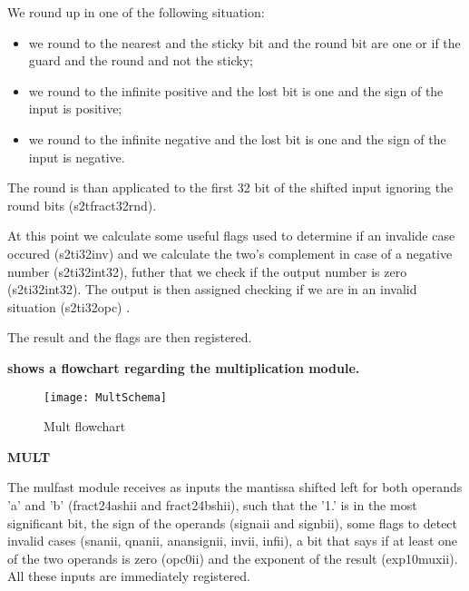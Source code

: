 We round up in one of the following situation:
\begin{itemize}
\item we round to the nearest and the sticky bit and the round bit are one or if the guard and the round and not the sticky;
\item we round to the infinite positive and the lost bit is one and the sign of the input is positive;
\item we round to the infinite negative and the lost bit is one and the sign of the input is negative.
\end{itemize}
The round is than applicated to the first 32 bit of the shifted input ignoring the round bits (s2t\textunderscore fract32\textunderscore rnd).

At this point we calculate some useful flags used to determine if an invalide case occured (s2t\textunderscore i32\textunderscore inv) and we calculate the two's complement in case of a negative number (s2t\textunderscore i32\textunderscore int32), futher that we check if the output number is zero (s2t\textunderscore i32\textunderscore int32).
The output is then assigned checking if we are in an invalid situation (s2t\textunderscore i32\textunderscore opc) .

The result and the flags are then registered.
\newline

\textbf{
 shows a flowchart regarding the multiplication module.}
\newline

\begin{figure}
\centering\texttt{[image: MultSchema]}
\caption{Mult flowchart}	
\label{fig:mult_schema}
\end{figure}

\textbf{MULT}
\newline

The mul\textunderscore fast module receives as inputs the mantissa shifted left for both operands 'a' and 'b' (fract24ash\textunderscore ii and fract24bsh\textunderscore ii), such that the '1.' is in the most significant bit, the sign of the operands (signa\textunderscore ii and signb\textunderscore ii), some flags to detect invalid cases (snan\textunderscore ii, qnan\textunderscore ii, anan\textunderscore sign\textunderscore ii, inv\textunderscore ii, inf\textunderscore ii), a bit that says if at least one of the two operands is zero (opc0\textunderscore ii) and the exponent of the result (exp10mux\textunderscore ii). All these inputs are immediately registered.

